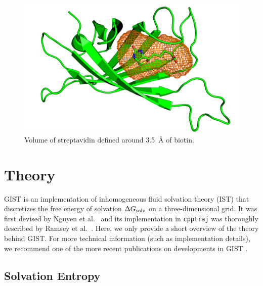 \documentclass[9pt,tutorial]{livecoms}
\newcommand{\dgsolv}{\Delta G_\textup{solv}}
\newcommand{\software}{\texttt}
\begin{document}
\begin{figure}
	\centering
	\includegraphics[width=1.0\linewidth]{streptavidin_bp_close.png}
	\caption{Volume of streptavidin defined around \SI{3.5}{\angstrom} of biotin. }\label{streptavidin_volume}
\end{figure}
\pagebreak %
\section{Theory}
\label{sec:theory}
GIST is an implementation of inhomogeneous fluid solvation theory (IST) \cite{Lazaridis1998} that discretizes the free energy of solvation $\dgsolv$ on a three-dimensional grid. 
It was first devised by Nguyen et al.\ \cite{Nguyen2012} and its implementation in \software{cpptraj} was thoroughly described by Ramsey et al.\ \cite{Ramsey2016}.
Here, we only provide a short overview of the theory behind GIST.
For more technical information (such as implementation details), we recommend one of the more recent publications on developments in GIST \cite{Kraml2020,Chen2021,Roe2023-mpi-gist}.

\subsection{Solvation Entropy}
\end{document}
